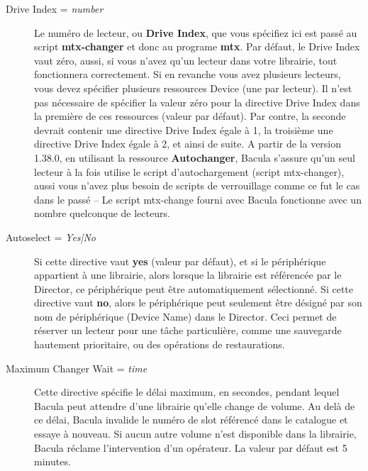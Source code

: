 \begin{description}
\item [Drive Index = {\it number}]
   Le num\'ero de lecteur, ou {\bf Drive Index}, que vous sp\'ecifiez ici est 
   pass\'e au script {\bf mtx-changer} et donc au programe {\bf mtx}. 
   Par d\'efaut, le Drive Index vaut z\'ero, aussi, si vous n'avez qu'un 
   lecteur dans votre librairie, tout fonctionnera correctement. 
   Si en revanche vous avez plusieurs lecteurs, vous devez sp\'ecifier 
   plusieurs ressources Device (une par lecteur).
   Il n'est pas n\'ecessaire de sp\'ecifier la valeur z\'ero pour la directive 
   Drive Index dans la premi\`ere de ces ressources (valeur par d\'efaut). Par 
   contre, la seconde devrait contenir une directive Drive Index \'egale \`a 1, 
   la troisi\`eme une directive Drive Index \'egale \`a 2, et ainsi de suite. 
   A partir de la version 1.38.0, en utilisant la ressource {\bf Autochanger}, 
   Bacula s'assure qu'un seul lecteur \`a la fois utilise le script d'autochargement 
   (script mtx-changer), aussi vous n'avez plus besoin de scripts de verrouillage 
   comme ce fut le cas dans le pass\'e -- Le script mtx-change fourni avec Bacula 
   fonctionne avec un nombre quelconque de lecteurs.
   
\item [Autoselect = {\it Yes|No}]
   Si cette directive vaut {\bf yes} (valeur par d\'efaut), et si le p\'eriph\'erique 
   appartient \`a une librairie, alors lorsque la librairie est r\'ef\'erenc\'ee par 
   le Director, ce p\'eriph\'erique peut \^etre automatiquement s\'electionn\'e. 
   Si cette directive vaut {\bf no}, alors le p\'eriph\'erique peut seulement 
   \^etre d\'esign\'e par son nom de p\'eriph\'erique (Device Name) dans le 
   Director. Ceci permet de r\'eserver un lecteur pour une t\^ache particuli\`ere, 
   comme une sauvegarde hautement prioritaire, ou des op\'erations de restaurations.

\item [Maximum Changer Wait = {\it time}]
   Cette directive sp\'ecifie le d\'elai maximum, en secondes, pendant lequel Bacula 
   peut attendre d'une librairie qu'elle change de volume. Au del\`a de ce d\'elai, 
   Bacula invalide le num\'ero de slot r\'ef\'erenc\'e dans le catalogue et essaye \`a 
   nouveau. Si aucun autre volume n'est disponible dans la librairie, Bacula 
   r\'eclame l'intervention d'un op\'erateur. La valeur par d\'efaut est 5 minutes.
   

\end{description}

